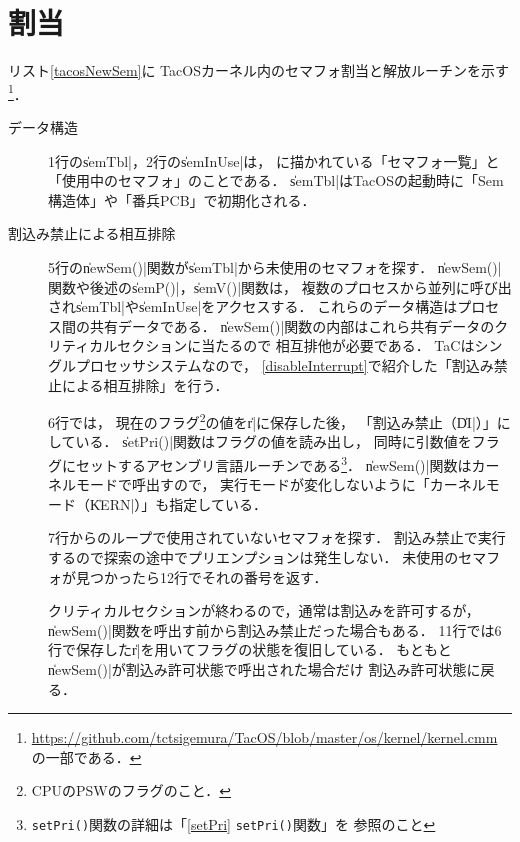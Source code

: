 \section{割当}
リスト\ref{tacosNewSem}に
TacOSカーネル内のセマフォ割当と解放ルーチンを示す\footnote{
  \url{https://github.com/tctsigemura/TacOS/blob/master/os/kernel/kernel.cmm}
  の一部である．}．



\begin{description}
\item [データ構造]
  1行の\|semTbl|，2行の\|semInUse|は，
   に描かれている「セマフォ一覧」と
 「使用中のセマフォ」のことである．
 \|semTbl|はTacOSの起動時に「Sem構造体」や「番兵PCB」で初期化される．

\item [割込み禁止による相互排除]
  5行の\|newSem()|関数が\|semTbl|から未使用のセマフォを探す．
  \|newSem()|関数や後述の\|semP()|，\|semV()|関数は，
  複数のプロセスから並列に呼び出され\|semTbl|や\|semInUse|をアクセスする．
  これらのデータ構造はプロセス間の共有データである．
  \|newSem()|関数の内部はこれら共有データのクリティカルセクションに当たるので
  相互排他が必要である．
  TaCはシングルプロセッサシステムなので，
  \ref{disableInterrupt}で紹介した「割込み禁止による相互排除」を行う．

  6行では，
  現在のフラグ\footnote{CPUのPSWのフラグのこと．}の値を\|r|に保存した後，
  「割込み禁止（\|DI|）」にしている．
  \|setPri()|関数はフラグの値を読み出し，
  同時に引数値をフラグにセットするアセンブリ言語ルーチンである\footnote{
    \texttt{setPri()}関数の詳細は「\ref{setPri} \texttt{setPri()}関数」を
    参照のこと}．
  \|newSem()|関数はカーネルモードで呼出すので，
  実行モードが変化しないように「カーネルモード（\|KERN|）」も指定している．

  7行からのループで使用されていないセマフォを探す．
  割込み禁止で実行するので探索の途中でプリエンプションは発生しない．
  未使用のセマフォが見つかったら12行でそれの番号を返す．

  クリティカルセクションが終わるので，通常は割込みを許可するが，
  \|newSem()|関数を呼出す前から割込み禁止だった場合もある．
  11行では6行で保存した\|r|を用いてフラグの状態を復旧している．
  もともと\|newSem()|が割込み許可状態で呼出された場合だけ
  割込み許可状態に戻る．


\end{description}
